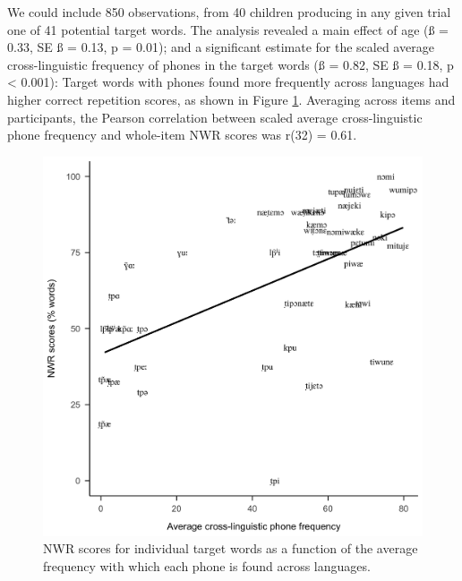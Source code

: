 \documentclass[english,,man,floatsintext]{apa6}
\begin{document}
We could include 850 observations, from 40 children producing in any given trial one of 41 potential target words. The analysis revealed a main effect of age (ß = 0.33, SE ß = 0.13, p = 0.01); and a significant estimate for the scaled average cross-linguistic frequency of phones in the target words (ß = 0.82, SE ß = 0.18, p \textless{} 0.001): Target words with phones found more frequently across languages had higher correct repetition scores, as shown in Figure \ref{fig:Fig2-xling-freq}. Averaging across items and participants, the Pearson correlation between scaled average cross-linguistic phone frequency and whole-item NWR scores was r(32) = 0.61.

\begin{figure}[!t]

{\centering \includegraphics[width=0.65\linewidth]{nwr.by.freq.ITEM} 

}

\caption{NWR scores for individual target words as a function of the average frequency with which each phone is found across languages.}\label{fig:Fig2-xling-freq}
\end{figure}
\end{document}
